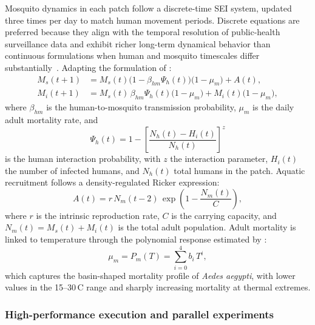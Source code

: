 \documentclass[applsci,article,accept,pdftex,moreauthors]{Definitions/mdpi}
\begin{document}
Mosquito dynamics in each patch follow a discrete-time SEI system, updated three times per day to match human movement periods. Discrete equations are preferred because they align with the temporal resolution of public-health surveillance data and exhibit richer long-term dynamical behavior than continuous formulations when human and mosquito timescales differ substantially~\cite{cao2015discrete,li2019discrete}. Adapting the formulation of \citet{catano2022discrete}:
\begin{equation}
\begin{aligned}
M_{s}(t+1) &= M_{s}(t)\bigl(1-\beta_{hm}\Psi_{h}(t)\bigr)\bigl(1-\mu_{m}\bigr) + A(t), \\
M_{i}(t+1) &= M_{s}(t)\,\beta_{hm}\Psi_{h}(t)\bigl(1-\mu_{m}\bigr)
            + M_{i}(t)\bigl(1-\mu_{m}\bigr),
\end{aligned}
\label{eq:mosquito_dynamics}
\end{equation}
where $\beta_{hm}$ is the human-to-mosquito transmission probability, $\mu_m$ is the daily adult mortality rate, and
\begin{equation}
\Psi_{h}(t) = 1 -
\left[\frac{N_{h}(t) - H_{i}(t)}{N_{h}(t)}\right]^{z}
\label{eq:psi}
\end{equation}
is the human interaction probability, with $z$ the interaction parameter, $H_i(t)$ the number of infected humans, and $N_h(t)$ total humans in the patch. Aquatic recruitment follows a density-regulated Ricker expression:
\begin{equation}
A(t) = r\,N_m(t-2)\,\exp\!\left(1-\frac{N_m(t)}{C}\right),
\label{eq:ricker}
\end{equation}
where $r$ is the intrinsic reproduction rate, $C$ is the carrying capacity, and $N_m(t)=M_s(t)+M_i(t)$ is the total adult population. Adult mortality is linked to temperature through the polynomial response estimated by \citet{mortality_temp_estimate}:
\begin{equation}
\mu_m = P_m(T) = \sum_{i=0}^{4} b_i\,T^i,
\label{eq:mortality_temp}
\end{equation}
which captures the basin-shaped mortality profile of \textit{Aedes aegypti}, with lower values in the 15--30\,\textdegree C range and sharply increasing mortality at thermal extremes.

\subsubsection{High-performance execution and parallel experiments}
\label{sec:implementation}
\end{document}
